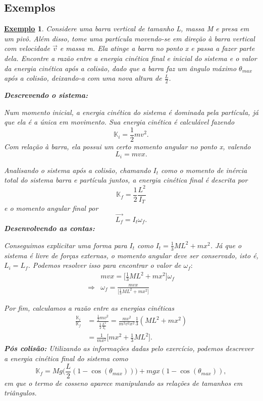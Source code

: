 \documentclass{article}
\newtheorem{example}{\underline{Exemplo}}
\begin{document}
\subsection{Exemplos}
\begin{example}
  Considere uma barra vertical de tamanho L, massa M e presa em um pivô. Além disso, tome uma partícula movendo-se em direção à barra vertical com velocidade \(\vec{v}\) e massa m.
Ela atinge a barra no ponto x e passa a fazer parte dela. Encontre a razão entre a energia cinética final e inicial do sistema e o valor da energia cinética após a colisão, dado
que a barra faz um ângulo máximo \(\theta_{max}\) após a colisão, deixando-a com uma nova altura de \(\frac{L}{2}\).

\textbf{Descrevendo o sistema:} 

  Num momento inicial, a energia cinética do sistema é dominada pela partícula, já que ela é a única em movimento. Sua energia cinética é calculável fazendo 
  \[
    \mathbb{K}_{i} = \frac{1}{2}mv^{2}.
  \]
  Com relação à barra, ela possui um certo momento angular no ponto x, valendo 
  \[
    L_{i} = mvx.
  \]

  Analisando o sistema após a colisão, chamando \(I_{t}\) como o momento de inércia total do sistema barra e partícula juntos, a energia cinética final
é descrita por 
  \[
    \mathbb{K}_{f} = \frac{1}{2}\frac{L^{2}}{I_{T}}
  \]
  e o momento angular final por 
  \[
    \vec{L_{f}} = I_{t}\omega_{f}.
  \]
\textbf{Desenvolvendo as contas:}

  Conseguimos explicitar uma forma para \(I_{t}\) como \(I_{t} = \frac{1}{3}ML^{2} + mx^{2}\). Já que o sistema é livre de forças externas, o momento angular deve ser conservado, isto é,
 \(L_{i} = L_{f}\). Podemos resolver isso para encontrar o valor de \(\omega_{f}:\)
 \begin{align*}
   &mvx = \biggl[\frac{1}{3}ML^{2} + mx^{2}\biggr]\omega_{f}\\
   \Rightarrow &\omega_{f} = \frac{mvx}{\biggl[\frac{1}{3}ML^{2}+mx^{2}\biggr]}
 \end{align*}

  Por fim, calculamos a razão entre as energias cinéticas
 \begin{align*}
   \frac{\mathbb{K}_{i}}{\mathbb{K}_{f}} &= \frac{\frac{1}{2}mv^{2}}{\frac{1}{2}\frac{L^{2}}{I_{t}}} = \frac{mv^{2}}{m^{2}v^{2}x^{2}}\frac{1}{3}(ML^{2}+mx^{2})\\
                                         &= \frac{1}{mx^{2}}\biggl[mx^{2}+\frac{1}{3}ML^{2}\biggr].
 \end{align*}
\textbf{Pós colisão:}
  Utilizando as informações dadas pelo exercício, podemos descrever a energia cinética final do sistema como 
    \[
      \mathbb{K}_{f}=Mg \biggl(\frac{L}{2}(1-\cos{(\theta_{max} )})\biggr) + mgx(1-\cos{(\theta_{max} )}),
    \]
    em que o termo de cosseno aparece manipulando as relações de tamanhos em triângulos.
\end{example}
\end{document}
